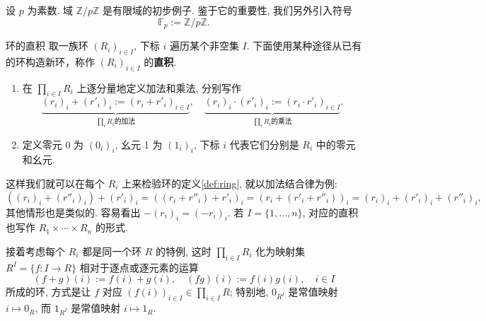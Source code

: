 \documentclass[12pt, a4paper]{ctexart}
\begin{document}
设 $p$ 为素数. 域 $\mathbb{Z}/p\mathbb{Z}$ 是有限域的初步例子. 鉴于它的重要性, 我们另外引入符号
\[
\mathbb{F}_p := \mathbb{Z}/p\mathbb{Z}.
\]
\begin{definition}{环的直积}{}
	取一族环 $(R_i)_{i \in I}$, 下标 $i$ 遍历某个非空集 $I$. 下面使用某种途径从已有的环构造新环，称作 $(R_i)_{i \in I}$ 的\textbf{直积}.  
	\begin{enumerate}[(1)]
		\item 在 $\prod\limits_{i \in I} R_i$ 上逐分量地定义加法和乘法, 分别写作
		\[
		\underbrace{(r_i)_i + (r'_i)_i := (r_i + r'_i)_{i \in I}}_{\prod_i R_i\text{的加法}}, \quad \underbrace{(r_i)_i \cdot (r'_i)_i := (r_i \cdot r'_i)_{i \in I}}_{\prod_i R_i\text{的乘法}}.
		\]
		\item 定义零元 0 为 $(0_i)_i$, 幺元 1 为 $(1_i)_i$, 下标 $i$ 代表它们分别是 $R_i$ 中的零元和幺元. 
	\end{enumerate}
	这样我们就可以在每个 $R_i$ 上来检验环的定义\ref{def:ring}, 就以加法结合律为例:
	\[
	((r_i)_i + (r''_i)_i) + (r'_i)_i = ((r_i + r''_i) + r'_i)_i = (r_i + (r'_i + r''_i))_i = (r_i)_i + (r'_i)_i + (r''_i)_i,
	\]
	其他情形也是类似的. 容易看出 $-(r_i)_i = (-r_i)_i$. 若 $I = \{1, \ldots, n\}$, 对应的直积也写作 $R_1 \times \cdots \times R_n$ 的形式.  
\end{definition}
接着考虑每个 $R_i$ 都是同一个环 $R$ 的特例, 这时 $\prod\limits_{i \in I} R_i$ 化为映射集 $R^I = \{f : I \rightarrow R\}$ 相对于逐点或逐元素的运算
\[
(f + g)(i) := f(i) + g(i), \quad (fg)(i) := f(i)g(i), \quad i \in I
\]
所成的环, 方式是让 $f$ 对应 $(f(i))_{i \in I} \in \prod\limits_{i \in I} R$; 特别地, $0_{R^I}$ 是常值映射 $i \mapsto 0_R$, 而 $1_{R^I}$ 是常值映射 $i \mapsto 1_R$. 
\end{document}
